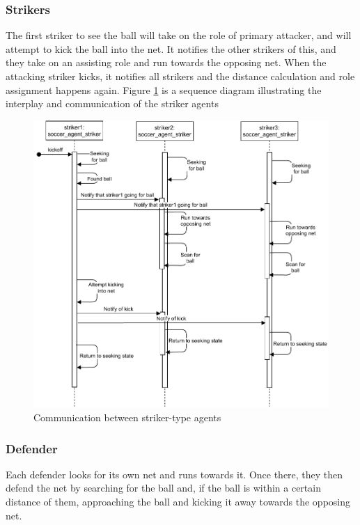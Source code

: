 \documentclass[conference]{IEEEtran}
\begin{document}
\subsubsection{Strikers}
The first striker to see the ball will take on the role of primary attacker, and will attempt to kick the ball into the net. It notifies the other strikers of this, and they take on an assisting role and run towards the opposing net. When the attacking striker kicks, it notifies all strikers and the distance calculation and role assignment happens again. Figure \ref{sequence-diagram} is a sequence diagram illustrating the interplay and communication of the striker agents 
\begin{figure}[]
	\centering
	\includegraphics[scale=0.5]{fig/sequence-diagram.pdf}
	\caption{Communication between striker-type agents}
	\label{sequence-diagram}
\end{figure}

\subsubsection{Defender}
Each defender looks for its own net and runs towards it. Once there, they then defend the net by searching for the ball and, if the ball is within a certain distance of them, approaching the ball and kicking it away towards the opposing net.
\end{document}
